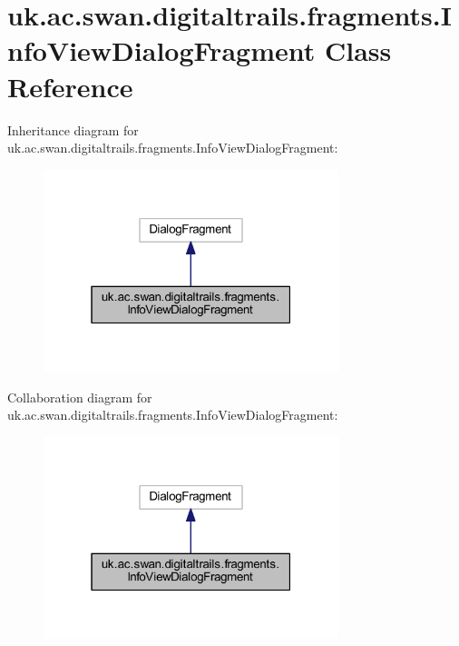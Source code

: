 \hypertarget{classuk_1_1ac_1_1swan_1_1digitaltrails_1_1fragments_1_1_info_view_dialog_fragment}{\section{uk.\+ac.\+swan.\+digitaltrails.\+fragments.\+Info\+View\+Dialog\+Fragment Class Reference}
\label{classuk_1_1ac_1_1swan_1_1digitaltrails_1_1fragments_1_1_info_view_dialog_fragment}
}


Inheritance diagram for uk.\+ac.\+swan.\+digitaltrails.\+fragments.\+Info\+View\+Dialog\+Fragment\+:\nopagebreak
\begin{figure}[H]
\begin{center}
\leavevmode
\includegraphics[width=244pt]{classuk_1_1ac_1_1swan_1_1digitaltrails_1_1fragments_1_1_info_view_dialog_fragment__inherit__graph}
\end{center}
\end{figure}


Collaboration diagram for uk.\+ac.\+swan.\+digitaltrails.\+fragments.\+Info\+View\+Dialog\+Fragment\+:\nopagebreak
\begin{figure}[H]
\begin{center}
\leavevmode
\includegraphics[width=244pt]{classuk_1_1ac_1_1swan_1_1digitaltrails_1_1fragments_1_1_info_view_dialog_fragment__coll__graph}
\end{center}
\end{figure}
